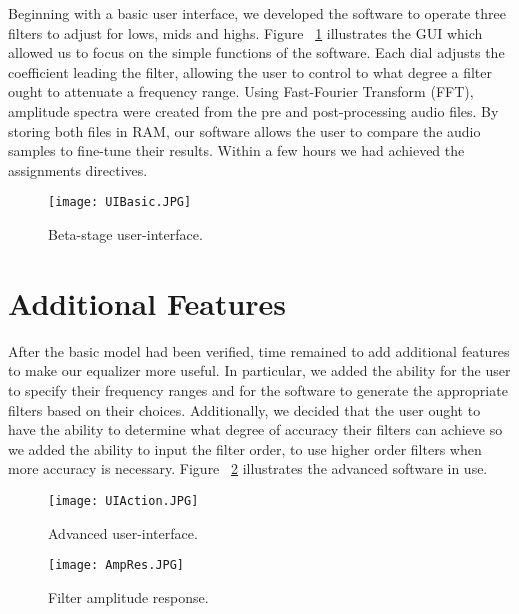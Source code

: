 Beginning with a basic user interface, we developed the software to operate three filters to adjust for lows, mids and highs. Figure 
~\ref{Beta} illustrates the GUI which allowed us to focus on the simple functions of the software. Each dial adjusts the coefficient leading the filter, allowing the user to control to what degree a filter ought to attenuate a frequency range. Using Fast-Fourier Transform (FFT), amplitude spectra were created from the pre and post-processing audio files. By storing both files in RAM, our software allows the user to compare the audio samples to fine-tune their results. Within a few hours we had achieved the assignments directives.

\begin{figure}[h!]
	\begin{center}
		\texttt{[image: UIBasic.JPG]}
	\end{center}
	\vspace{-1em}
	\caption{Beta-stage user-interface.}
	\label{Beta}
\end{figure}


%
%

\newpage
\section{Additional Features}

After the basic model had been verified, time remained to add additional features to make our equalizer more useful. In particular, we added the ability for the user to specify their frequency ranges and for the software to generate the appropriate filters based on their choices. Additionally, we decided that the user ought to have the ability to determine what degree of accuracy their filters can achieve so we added the ability to input the filter order, to use higher order filters when more accuracy is necessary. Figure ~\ref{Alpha} illustrates the advanced software in use.

\begin{figure}[h!]
	\begin{center}
		\texttt{[image: UIAction.JPG]}
	\end{center}
	\vspace{-1em}
	\caption{Advanced user-interface.}
	\label{Alpha}
\end{figure}

\begin{wrapfigure}{r}{0.33\textwidth}
	\begin{center}
		\texttt{[image: AmpRes.JPG]}
	\end{center}
	\vspace{-1em}
	\caption{Filter amplitude response.}
	\label{FilterView}
\end{wrapfigure}


